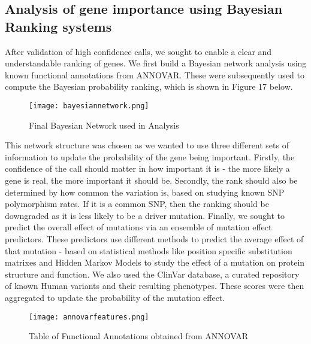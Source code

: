 \documentclass{article}
\begin{document}
\subsection{Analysis of gene importance using Bayesian Ranking systems}
After validation of high confidence calls, we sought to enable a clear and understandable ranking of genes. We first build a Bayesian network analysis using known functional annotations from ANNOVAR. These were subsequently used to compute the Bayesian probability ranking, which is shown in Figure 17 below.


\begin{figure}[H]
\texttt{[image: bayesiannetwork.png]}
\caption{Final Bayesian Network used in Analysis}
\centering
\end{figure}

This network structure was chosen as we wanted to use three different sets of information to update the probability of the gene being important. Firstly, the confidence of the call should matter in how important it is - the more likely a gene is real, the more important it should be. Secondly, the rank should also be determined by how common the variation is, based on studying known SNP polymorphism rates. If it is a common SNP, then the ranking should be downgraded as it is less likely to be a driver mutation. Finally, we sought to predict the overall effect of mutations via an ensemble of mutation effect predictors. These predictors use different methods to predict the average effect of that mutation - based on statistical methods like position specific substitution matrixes and Hidden Markov Models to study the effect of a mutation on protein structure and function. We also used the ClinVar database, a curated repository of known Human variants and their resulting phenotypes. These scores were then aggregated to update the probability of the mutation effect.

\begin{figure}[H]
\caption{Table of Functional Annotations obtained from ANNOVAR}
\texttt{[image: annovarfeatures.png]}
\centering
\end{figure}
\end{document}
